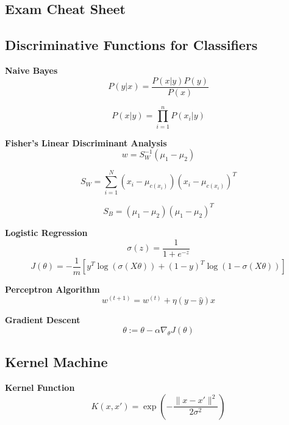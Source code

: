 \documentclass[8pt]{article}
\begin{document}
\begin{multicols}{2}
\section*{Exam Cheat Sheet}

\subsection*{Discriminative Functions for Classifiers}
\textbf{Naive Bayes}
\begin{equation}
    P(y|x) = \frac{P(x|y)P(y)}{P(x)}
\end{equation}

\begin{equation}
    P(x|y) = \prod_{i=1}^{n} P(x_i|y)
\end{equation}

\textbf{Fisher's Linear Discriminant Analysis}
\begin{equation}
    w = S_W^{-1} (\mu_1 - \mu_2)
\end{equation}

\begin{equation}
    S_W = \sum_{i=1}^{N} (x_i - \mu_{c(x_i)})(x_i - \mu_{c(x_i)})^T
\end{equation}

\begin{equation}
    S_B = (\mu_1 - \mu_2)(\mu_1 - \mu_2)^T
\end{equation}

\textbf{Logistic Regression}
\begin{equation}
    \sigma(z) = \frac{1}{1 + e^{-z}}
\end{equation}
\begin{equation}
    J(\theta) = -\frac{1}{m} [y^T\log(\sigma(X\theta)) + (1-y)^T\log(1-\sigma(X\theta))]
\end{equation}

\textbf{Perceptron Algorithm}
\begin{equation}
    w^{(t+1)} = w^{(t)} + \eta (y - \hat{y}) x
\end{equation}

\textbf{Gradient Descent}
\begin{equation}
    \theta := \theta - \alpha \nabla_{\theta} J(\theta)
\end{equation}

\subsection*{Kernel Machine}
\textbf{Kernel Function}
\begin{equation}
    K(x, x') = \exp\left(-\frac{\|x - x'\|^2}{2\sigma^2}\right) %
\end{equation}


\end{multicols}
\end{document}
